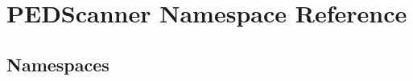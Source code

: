 \hypertarget{namespace_p_e_d_scanner}{}\section{P\+E\+D\+Scanner Namespace Reference}
\label{namespace_p_e_d_scanner}
\subsection*{Namespaces}
\begin{DoxyCompactItemize}
\end{DoxyCompactItemize}
